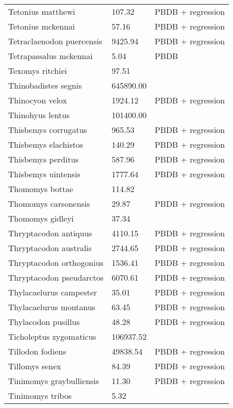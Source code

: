 \documentclass{article}
\begin{document}
\begin{center}
\begin{longtable}{p{} p{} p{}}
    Tetonius matthewi & 107.32 & PBDB + regression \\ 
    Tetonius mckennai & 57.16 & PBDB + regression \\ 
    Tetraclaenodon puercensis & 9425.94 & PBDB + regression \\ 
    Tetrapassalus mckennai & 5.04 & PBDB \\ 
    Texomys ritchiei & 97.51 & \cite{Tomiya2013} \\ 
    Thinobadistes segnis & 645890.00 & \cite{McDonald2005} \\ 
    Thinocyon velox & 1924.12 & PBDB + regression \\ 
    Thinohyus lentus & 101400.00 & \cite{McKenna2011} \\ 
    Thisbemys corrugatus & 965.53 & PBDB + regression \\ 
    Thisbemys elachistos & 140.29 & PBDB + regression \\ 
    Thisbemys perditus & 587.96 & PBDB + regression \\ 
    Thisbemys uintensis & 1777.64 & PBDB + regression \\ 
    Thomomys bottae & 114.82 & \cite{Smith2004} \\ 
    Thomomys carsonensis & 29.87 & PBDB + regression \\ 
    Thomomys gidleyi & 37.34 & \cite{Tomiya2013} \\ 
    Thryptacodon antiquus & 4110.15 & PBDB + regression \\ 
    Thryptacodon australis & 2744.65 & PBDB + regression \\ 
    Thryptacodon orthogonius & 1536.41 & PBDB + regression \\ 
    Thryptacodon pseudarctos & 6070.61 & PBDB + regression \\ 
    Thylacaelurus campester & 35.01 & PBDB + regression \\ 
    Thylacaelurus montanus & 63.45 & PBDB + regression \\ 
    Thylacodon pusillus & 48.28 & PBDB + regression \\ 
    Ticholeptus zygomaticus & 106937.52 & \cite{Tomiya2013} \\ 
    Tillodon fodiens & 49838.54 & PBDB + regression \\ 
    Tillomys senex & 84.39 & PBDB + regression \\ 
    Tinimomys graybulliensis & 11.30 & PBDB + regression \\ 
    Tinimomys tribos & 5.32 & \cite{Skinner1972} \\ 

\end{longtable}
\end{center}
\end{document}
